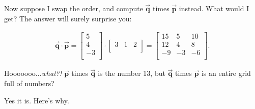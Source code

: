 Now suppose I swap the order, and compute $\overrightarrow{\textbf{q}}$ times
$\overrightarrow{\textbf{p}}$ instead. What would I get? The answer will surely
surprise you:

\vspace{-.15in}
\begin{align*}
\overrightarrow{\textbf{q}} \cdot \overrightarrow{\textbf{p}} =
\begin{bmatrix}
5 \\ 4 \\ -3 \\
\end{bmatrix} \cdot
\begin{bmatrix}
3 & 1 & 2 \\
\end{bmatrix} =
\begin{bmatrix}
15 & 5 & 10 \\
12 & 4 & 8 \\
-9 & -3 & -6 \\
\end{bmatrix}.
\end{align*}
\vspace{-.15in}

Hooooooo...\textit{what?!} $\overrightarrow{\textbf{p}}$ times
$\overrightarrow{\textbf{q}}$ is the number 13, but
$\overrightarrow{\textbf{q}}$ times $\overrightarrow{\textbf{p}}$ is an entire
grid full of numbers?

Yes it is. Here's why. 
